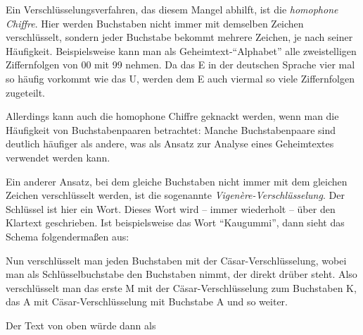 \documentclass{zusammenfassung}
\begin{document}
Ein Verschlüsselungsverfahren, das diesem Mangel abhilft, ist die \emph{homophone Chiffre}. Hier werden Buchstaben nicht immer mit
demselben Zeichen verschlüsselt, sondern jeder Buchstabe bekommt mehrere Zeichen, je nach seiner Häufigkeit. Beispielsweise kann
man als Geheimtext-"`Alphabet"' alle zweistelligen Ziffernfolgen von 00 mit 99 nehmen. Da das E in der deutschen Sprache vier mal 
so häufig vorkommt wie das U, werden dem E auch viermal so viele Ziffernfolgen zugeteilt.

Allerdings kann auch die homophone Chiffre geknackt werden, wenn man die Häufigkeit von Buchstabenpaaren betrachtet: Manche
Buchstabenpaare sind deutlich häufiger als andere, was als Ansatz zur Analyse eines Geheimtextes verwendet werden kann.

Ein anderer Ansatz, bei dem gleiche Buchstaben nicht immer mit dem gleichen Zeichen verschlüsselt werden, ist die sogenannte
\emph{Vigenère-Verschlüsselung}. Der Schlüssel ist hier ein Wort. Dieses Wort wird -- immer wiederholt -- über den Klartext 
geschrieben. Ist beispielsweise das Wort "`Kaugummi"', dann sieht das Schema folgendermaßen aus:

\begin{center}
  \def\secret{KAU GUMM IKAU GUMM IKAUGUM MIK AUGUMMI KAUGUM}
  \def\text{MAN KANN FUER JEDE LOESUNG EIN PROBLEM FINDEN.}
\end{center}

Nun verschlüsselt man jeden Buchstaben mit der Cäsar-Verschlüsselung, wobei man als Schlüsselbuchstabe den
Buchstaben nimmt, der direkt drüber steht. Also verschlüsselt man das erste M mit der Cäsar-Verschlüsselung zum Buchstaben K, das
A mit Cäsar-Verschlüsselung mit Buchstabe A und so weiter.

Der Text von oben würde dann als 

\begin{center}
  \def\text{WAH EMZV FOKL VMNE RIQECXG KCZ XBOVRYY NSNXKH.}
\end{center}
\end{document}
